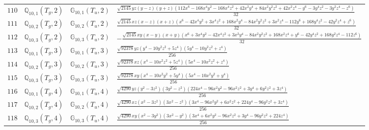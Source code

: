 \documentclass[fleqn,8pt,landscape]{jsarticle}
\begin{document}
\begin{table}[ht!]
\begin{center}
\begin{tabular}{cccl}
$ 110 $ & $ \mathbb{Q}_{10,1}(T_{g},2) $ & $ \mathbb{G}_{10,1}(T_{u},2) $ & $ \frac{\sqrt{2145} y z \left(y - z\right) \left(y + z\right) \left(112 x^{6} - 168 x^{4} y^{2} - 168 x^{4} z^{2} + 42 x^{2} y^{4} + 84 x^{2} y^{2} z^{2} + 42 x^{2} z^{4} - y^{6} - 3 y^{4} z^{2} - 3 y^{2} z^{4} - z^{6}\right)}{32} $ \\
$ 111 $ & $ \mathbb{Q}_{10,2}(T_{g},2) $ & $ \mathbb{G}_{10,2}(T_{u},2) $ & $ \frac{\sqrt{2145} x z \left(x - z\right) \left(x + z\right) \left(x^{6} - 42 x^{4} y^{2} + 3 x^{4} z^{2} + 168 x^{2} y^{4} - 84 x^{2} y^{2} z^{2} + 3 x^{2} z^{4} - 112 y^{6} + 168 y^{4} z^{2} - 42 y^{2} z^{4} + z^{6}\right)}{32} $ \\
$ 112 $ & $ \mathbb{Q}_{10,3}(T_{g},2) $ & $ \mathbb{G}_{10,3}(T_{u},2) $ & $ - \frac{\sqrt{2145} x y \left(x - y\right) \left(x + y\right) \left(x^{6} + 3 x^{4} y^{2} - 42 x^{4} z^{2} + 3 x^{2} y^{4} - 84 x^{2} y^{2} z^{2} + 168 x^{2} z^{4} + y^{6} - 42 y^{4} z^{2} + 168 y^{2} z^{4} - 112 z^{6}\right)}{32} $ \\
$ 113 $ & $ \mathbb{Q}_{10,1}(T_{g},3) $ & $ \mathbb{G}_{10,1}(T_{u},3) $ & $ \frac{\sqrt{92378} y z \left(y^{4} - 10 y^{2} z^{2} + 5 z^{4}\right) \left(5 y^{4} - 10 y^{2} z^{2} + z^{4}\right)}{256} $ \\
$ 114 $ & $ \mathbb{Q}_{10,2}(T_{g},3) $ & $ \mathbb{G}_{10,2}(T_{u},3) $ & $ \frac{\sqrt{92378} x z \left(x^{4} - 10 x^{2} z^{2} + 5 z^{4}\right) \left(5 x^{4} - 10 x^{2} z^{2} + z^{4}\right)}{256} $ \\
$ 115 $ & $ \mathbb{Q}_{10,3}(T_{g},3) $ & $ \mathbb{G}_{10,3}(T_{u},3) $ & $ \frac{\sqrt{92378} x y \left(x^{4} - 10 x^{2} y^{2} + 5 y^{4}\right) \left(5 x^{4} - 10 x^{2} y^{2} + y^{4}\right)}{256} $ \\
$ 116 $ & $ \mathbb{Q}_{10,1}(T_{g},4) $ & $ \mathbb{G}_{10,1}(T_{u},4) $ & $ \frac{\sqrt{4290} y z \left(y^{2} - 3 z^{2}\right) \left(3 y^{2} - z^{2}\right) \left(224 x^{4} - 96 x^{2} y^{2} - 96 x^{2} z^{2} + 3 y^{4} + 6 y^{2} z^{2} + 3 z^{4}\right)}{256} $ \\
$ 117 $ & $ \mathbb{Q}_{10,2}(T_{g},4) $ & $ \mathbb{G}_{10,2}(T_{u},4) $ & $ \frac{\sqrt{4290} x z \left(x^{2} - 3 z^{2}\right) \left(3 x^{2} - z^{2}\right) \left(3 x^{4} - 96 x^{2} y^{2} + 6 x^{2} z^{2} + 224 y^{4} - 96 y^{2} z^{2} + 3 z^{4}\right)}{256} $ \\
$ 118 $ & $ \mathbb{Q}_{10,3}(T_{g},4) $ & $ \mathbb{G}_{10,3}(T_{u},4) $ & $ \frac{\sqrt{4290} x y \left(x^{2} - 3 y^{2}\right) \left(3 x^{2} - y^{2}\right) \left(3 x^{4} + 6 x^{2} y^{2} - 96 x^{2} z^{2} + 3 y^{4} - 96 y^{2} z^{2} + 224 z^{4}\right)}{256} $ \\

\end{tabular}
\end{center}
\end{table}
\end{document}
